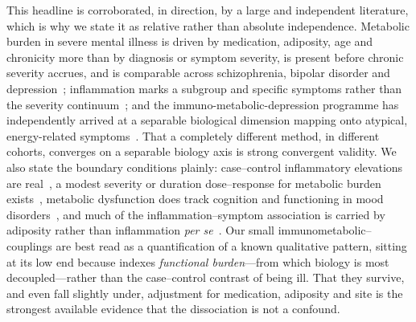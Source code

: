 This headline is corroborated, in direction, by a large and independent literature,
which is why we state it as relative rather than absolute independence. Metabolic
burden in severe mental illness is driven by medication, adiposity, age and chronicity
more than by diagnosis or symptom severity, is present before chronic severity
accrues, and is comparable across schizophrenia, bipolar disorder and
depression~\citep{vancampfort2015mets,vancampfort2016diabetes,pillinger2017,perry2019,garridotorres2022};
inflammation marks a subgroup and specific symptoms rather than the severity
continuum~\citep{osimo2019,fernandes2016bd,fernandes2016sz}; and the
immuno-metabolic-depression programme has independently arrived at a separable
biological dimension mapping onto atypical, energy-related
symptoms~\citep{penninx2024imd,milaneschi2020,lamers2013,lamers2020,milaneschi2017}.
That a completely different method, in different cohorts, converges on a separable
biology axis is strong convergent validity. We also state the boundary conditions
plainly: case--control inflammatory elevations are
real~\citep{howren2009,osimo2020,haapakoski2015}, a modest severity or duration
dose--response for metabolic burden exists~\citep{penninxlange2018,pillinger2022},
metabolic dysfunction does track cognition and functioning in mood
disorders~\citep{maksyutynska2024}, and much of the inflammation--symptom association
is carried by adiposity rather than inflammation \emph{per
se}~\citep{kappelmann2021,zagaria2024}. Our small immunometabolic--\Gfac{} couplings
are best read as a quantification of a known qualitative pattern, sitting at its low
end because \Gfac{} indexes \emph{functional burden}---from which biology is most
decoupled---rather than the case--control contrast of being ill. That they survive,
and even fall slightly under, adjustment for medication, adiposity and site is the
strongest available evidence that the dissociation is not a confound.

